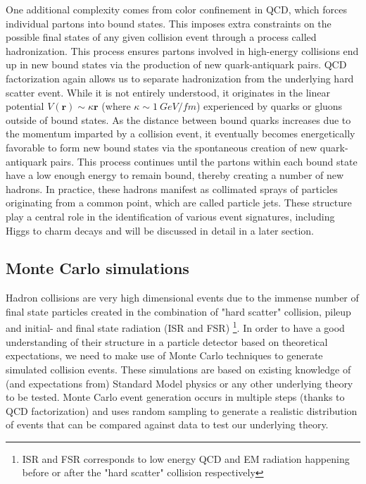 One additional complexity comes from color confinement in QCD, which forces individual partons into bound states. 
This imposes extra constraints on the possible final states of any given collision event through a process called 
hadronization. This process ensures partons involved in high-energy collisions end up in new bound states via the 
production of new quark-antiquark pairs. QCD factorization again allows us to separate hadronization from the 
underlying hard scatter event. While it is not entirely understood, it originates in the linear potential 
$V(\mathbf{r}) \sim \kappa\mathbf{r}$ (where $\kappa \sim 1\ GeV/fm$) experienced by quarks or gluons outside 
of bound states. As the distance between bound quarks increases due to the momentum imparted by a collision 
event, it eventually becomes energetically favorable to form new bound states via the spontaneous creation of new 
quark-antiquark pairs. This process continues until the partons within each bound state have a low enough energy 
to remain bound, thereby creating a number of new hadrons. In practice, these hadrons manifest as collimated 
sprays of particles originating from a common point, which are called particle jets. These structure play a central role 
in the identification of various event signatures, including Higgs to charm decays and will be discussed in detail 
in a later section.

\subsection{Monte Carlo simulations}

Hadron collisions are very high dimensional events due to the immense number of final state particles created 
in the combination of "hard scatter" collision, pileup and initial- and final state radiation (ISR and FSR)
\footnote{ISR and FSR corresponds to low energy QCD and EM radiation happening before or after the "hard scatter" 
collision respectively}. In order to have a good understanding of their structure in a particle detector based on 
theoretical expectations, we need to make use of Monte Carlo techniques to generate simulated collision events. 
These simulations are based on existing knowledge of (and expectations from) Standard Model physics or any 
other underlying theory to be tested. Monte Carlo event generation occurs in multiple steps (thanks to QCD 
factorization) and uses random sampling to generate a realistic distribution of events that can be compared 
against data to test our underlying theory. \par

